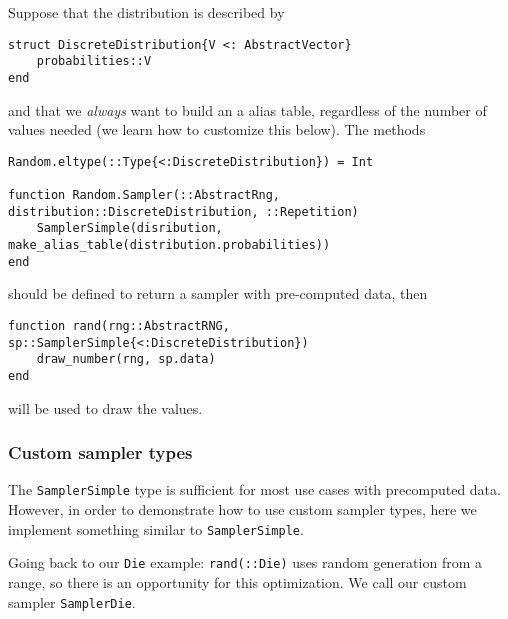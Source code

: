 Suppose that the distribution is described by




\begin{verbatim}
struct DiscreteDistribution{V <: AbstractVector}
    probabilities::V
end
\end{verbatim}



and that we \emph{always} want to build an a alias table, regardless of the number of values needed (we learn how to customize this below). The methods




\begin{verbatim}
Random.eltype(::Type{<:DiscreteDistribution}) = Int

function Random.Sampler(::AbstractRng, distribution::DiscreteDistribution, ::Repetition)
    SamplerSimple(disribution, make_alias_table(distribution.probabilities))
end
\end{verbatim}



should be defined to return a sampler with pre-computed data, then




\begin{verbatim}
function rand(rng::AbstractRNG, sp::SamplerSimple{<:DiscreteDistribution})
    draw_number(rng, sp.data)
end
\end{verbatim}



will be used to draw the values.



\hypertarget{4100919623062869062}{}


\subsubsection{Custom sampler types}



The \texttt{SamplerSimple} type is sufficient for most use cases with precomputed data. However, in order to demonstrate how to use custom sampler types, here we implement something similar to \texttt{SamplerSimple}.



Going back to our \texttt{Die} example: \texttt{rand(::Die)} uses random generation from a range, so there is an opportunity for this optimization. We call our custom sampler \texttt{SamplerDie}.




